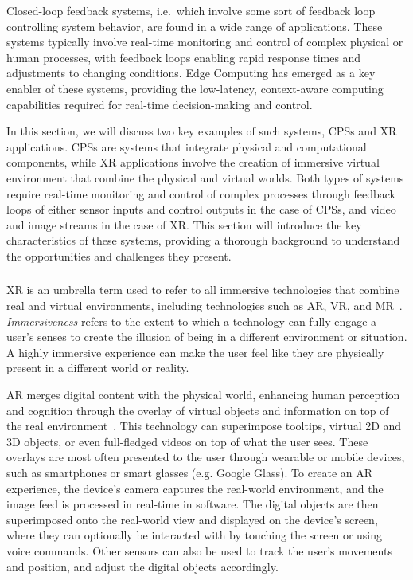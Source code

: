 Closed-loop feedback systems, i.e.\ which involve some sort of feedback loop controlling system behavior, are found in a wide range of applications.
These systems typically involve real-time monitoring and control of complex physical or human processes, with feedback loops enabling rapid response times and adjustments to changing conditions.
Edge Computing has emerged as a key enabler of these systems, providing the low-latency, context-aware computing capabilities required for real-time decision-making and control.

In this section, we will discuss two key examples of such systems, \glspl{CPS} and \gls{XR} applications.
\glspl{CPS} are systems that integrate physical and computational components, while \gls{XR} applications involve the creation of immersive virtual environment that combine the physical and virtual worlds.
Both types of systems require real-time monitoring and control of complex processes through feedback loops of either sensor inputs and control outputs in the case of \glspl{CPS}, and video and image streams in the case of \gls{XR}.
This section will introduce the key characteristics of these systems, providing a thorough background to understand the opportunities and challenges they present.

\subsubsection{}\label{background:xr}

\gls{XR} is an umbrella term used to refer to all immersive technologies that combine real and virtual environments, including technologies such as \gls{AR}, \gls{VR}, and \gls{MR}~\cite{doerner2022virtual}.
\emph{Immersiveness} refers to the extent to which a technology can fully engage a user's senses to create the illusion of being in a different environment or situation.
A highly immersive experience can make the user feel like they are physically present in a different world or reality.

\gls{AR} merges digital content with the physical world, enhancing human perception and cognition through the overlay of virtual objects and information on top of the real environment~\cite{doerner2022virtual}.
This technology can superimpose tooltips, virtual \gls{2D} and \gls{3D} objects, or even full-fledged videos on top of what the user sees.
These overlays are most often presented to the user through wearable or mobile devices, such as smartphones or smart glasses (e.g. Google Glass).
To create an \gls{AR} experience, the device's camera captures the real-world environment, and the image feed is processed in real-time in software.
The digital objects are then superimposed onto the real-world view and displayed on the device's screen, where they can optionally be interacted with by touching the screen or using voice commands.
Other sensors can also be used to track the user's movements and position, and adjust the digital objects accordingly.

